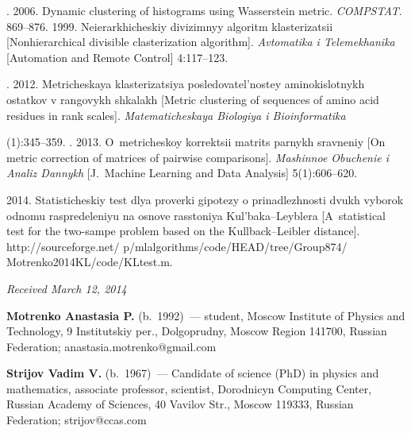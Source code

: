 \begin{multicols}{2}
{{\begin{thebibliography}{99}
\pagebreak

.  2006.
Dynamic clustering of histograms using Wasserstein metric.
\mbox{\textit{COMPSTAT}}. 869--876.
1999. Neierarkhicheskiy divizimnyy algoritm klasterizatsii
[Nonhierarchical divisible clasterization algorithm].
\textit{Avtomatika i Telemekhanika} [Automation and Remote Control] 4:117--123.

.
2012. Metricheskaya klasterizatsiya posledovatel'nostey aminokislotnykh
ostatkov v rangovykh shkalakh [Metric clustering of sequences of amino acid
residues in rank scales].
\textit{Matematicheskaya Biologiya i Bioinformatika}\linebreak\vspace*{-12pt}

\columnbreak

(1):345--359.
.  2013.
O~metricheskoy korrektsii matrits parnykh sravneniy
[On metric correction of matrices of pairwise comparisons].
\textit{Mashinnoe Obuchenie i Analiz Dannykh}
[J.~Machine Learning and Data Analysis]  5(1):606--620.

  2014.
Statisticheskiy test dlya proverki gipotezy o prinadlezhnosti dvukh vyborok
odnomu raspredeleniyu na osnove rasstoniya Kul'baka--Leyblera
[A~statistical test for the two-sampe problem based on the Kullback--Leibler
distance]. {\sf http://sourceforge.net/ p/mlalgorithms/code/HEAD/tree/Group874/ Motrenko2014KL/code/KLtest.m}.

\end{thebibliography}
} }


\end{multicols}

\vspace*{-6pt}

\hfill{\small\textit{Received March 12, 2014}}

\vspace*{-18pt}




\Contr

\noindent
\textbf{Motrenko Anastasia P.} (b.\ 1992)~---
student, Moscow Institute of Physics and Technology, 9 Institutskiy per., Dolgoprudny, Moscow Region 141700,
Russian Federation;   anastasia.motrenko@gmail.com

\vspace*{3pt}

\noindent
\textbf{Strijov Vadim V.} (b.\ 1967)~---
Candidate of science (PhD) in physics and mathematics, associate professor,
scientist, Dorodnicyn Computing Center, Russian Academy of Sciences,
40 Vavilov Str., Moscow 119333, Russian Federation;   strijov@ccas.com

 \label{end\stat}

\renewcommand{\bibname}{\protect\rm Литература}